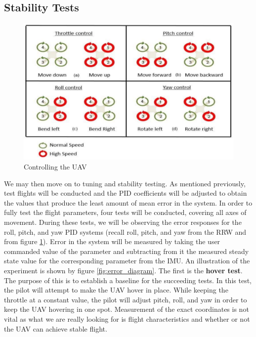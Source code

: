 \documentclass[english]{upeeei}
\begin{document}
\subsection{Stability Tests}
\begin{figure}[h]
    \centering
    \includegraphics[scale=0.5]{images/motor_signals.PNG}
    \caption{Controlling the UAV \cite{fcDesign2019}}
    \label{fig:motor_signals}
\end{figure}
We may then move on to tuning and stability testing. As mentioned previously, test flights
will be conducted and the PID coefficients will be adjusted to obtain the values that produce the least amount of mean error in the
system. In order to fully test the flight parameters, four tests will be conducted, covering all axes of movement. During these tests, we will be observing the error
responses for the roll, pitch, and yaw PID systems (recall roll, pitch, and yaw from the RRW and from figure \ref{fig:motor_signals}).
Error in the system will be measured by taking the user commanded value of the parameter and subtracting from it the measured steady 
state value for the corresponding parameter from the IMU. An illustration of the experiment is shown by figure \ref{fig:error_diagram}.
\newline
\newline
The first is the \textbf{hover test}. The purpose of this is to establish a baseline for the succeeding tests. In this test, the pilot
will attempt to make the UAV hover in place. While keeping the throttle at a constant value, the pilot will adjust pitch, roll, and yaw
in order to keep the UAV hovering in one spot. Measurement of the exact coordinates is not vital as what we are really looking for is
flight characteristics and whether or not the UAV can achieve stable flight.
\end{document}
